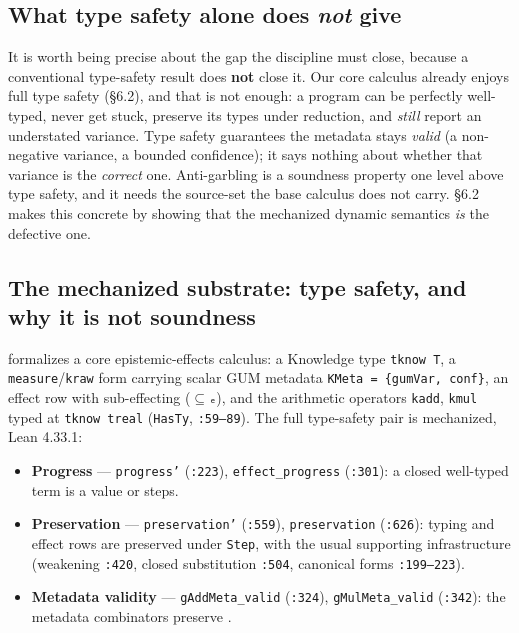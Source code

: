 \documentclass[sigplan,review,anonymous,10pt]{acmart}
\begin{document}
\subsection{What type safety alone does \emph{not} give}

It is worth being precise about the gap the discipline must close, because a conventional type-safety result does \textbf{not} close it. Our core calculus already enjoys full type safety (§6.2), and that is not enough: a program can be perfectly well-typed, never get stuck, preserve its types under reduction, and \emph{still} report an understated variance. Type safety guarantees the metadata stays \emph{valid} (a non-negative variance, a bounded confidence); it says nothing about whether that variance is the \emph{correct} one. Anti-garbling is a soundness property one level above type safety, and it needs the source-set the base calculus does not carry. §6.2 makes this concrete by showing that the mechanized dynamic semantics \emph{is} the defective one.

\subsection{The mechanized substrate: type safety, and why it is not soundness}

 formalizes a core epistemic-effects calculus: a Knowledge type \texttt{tknow T}, a \texttt{measure}/\texttt{kraw} form carrying scalar GUM metadata \texttt{KMeta = \{gumVar, conf\}}, an effect row with sub-effecting (\texttt{$\subseteq$ₑ}), and the arithmetic operators \texttt{kadd}, \texttt{kmul} typed at \texttt{tknow treal} (\texttt{HasTy}, \texttt{:59--89}). The full type-safety pair is mechanized, Lean 4.33.1:

\begin{itemize}
  \item \textbf{Progress} --- \texttt{progress'} (\texttt{:223}), \texttt{effect\_progress} (\texttt{:301}): a closed well-typed term is a value or steps.
  \item \textbf{Preservation} --- \texttt{preservation'} (\texttt{:559}), \texttt{preservation} (\texttt{:626}): typing and effect rows are preserved under \texttt{Step}, with the usual supporting infrastructure (weakening \texttt{:420}, closed substitution \texttt{:504}, canonical forms \texttt{:199--223}).
  \item \textbf{Metadata validity} --- \texttt{gAddMeta\_valid} (\texttt{:324}), \texttt{gMulMeta\_valid} (\texttt{:342}): the metadata combinators preserve .
\end{itemize}
\end{document}
